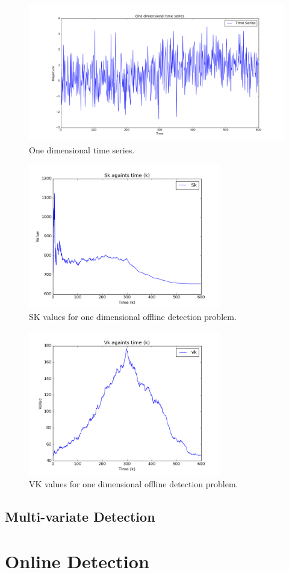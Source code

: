 \documentclass{article}
\begin{document}
\begin{figure}[ht!]
  \centering
  \includegraphics[width=1\textwidth]{images/1d_offline/ts}
  \caption{One dimensional time series.\label{fig:1d_ts}}
\end{figure}

\begin{figure}[ht!]
  \centering
  \includegraphics[width=0.75\textwidth]{images/1d_offline/sk}
  \caption{SK values for one dimensional offline detection problem.\label{fig:1d_sk}}
\end{figure}

\begin{figure}[ht!]
  \centering
  \includegraphics[width=0.75\textwidth]{images/1d_offline/vk}
  \caption{VK values for one dimensional offline detection problem.\label{fig:1d_vk}}
\end{figure}

\subsection{Multi-variate Detection}
\section{Online Detection}



\end{document}
